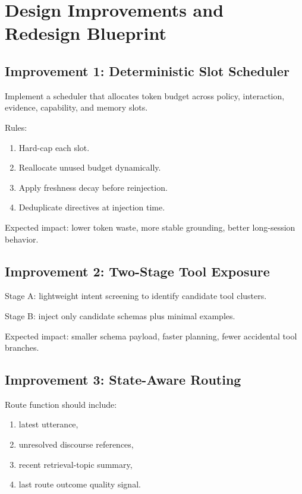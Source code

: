\documentclass[conference]{IEEEtran}
\begin{document}
\section{Design Improvements and Redesign Blueprint}
\label{sec:improvements}

\subsection{Improvement 1: Deterministic Slot Scheduler}

Implement a scheduler that allocates token budget across policy,
interaction,
evidence,
capability,
and memory slots.

Rules:

\begin{enumerate}[leftmargin=1.2em]
\item Hard-cap each slot.
\item Reallocate unused budget dynamically.
\item Apply freshness decay before reinjection.
\item Deduplicate directives at injection time.
\end{enumerate}

Expected impact:
lower token waste,
more stable grounding,
better long-session behavior.

\subsection{Improvement 2: Two-Stage Tool Exposure}

Stage A:
lightweight intent screening to identify candidate tool clusters.

Stage B:
inject only candidate schemas plus minimal examples.

Expected impact:
smaller schema payload,
faster planning,
fewer accidental tool branches.

\subsection{Improvement 3: State-Aware Routing}

Route function should include:

\begin{enumerate}[leftmargin=1.2em]
\item latest utterance,
\item unresolved discourse references,
\item recent retrieval-topic summary,
\item last route outcome quality signal.
\end{enumerate}
\end{document}

